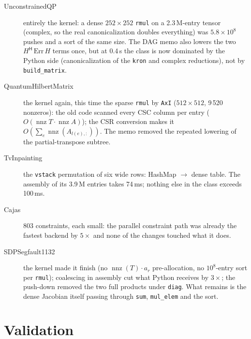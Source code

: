 \documentclass[11pt,a4paper]{article}
\newcommand{\nnz}{\operatorname{nnz}}
\newcommand{\code}[1]{\texttt{#1}}
\begin{document}
\begin{description}
  \item[UnconstrainedQP] entirely the kernel: a dense $252\times252$ \code{rmul} on a 2.3\,M-entry
  tensor (complex, so the real canonicalization doubles everything) was $5.8\times10^8$ pushes and a
  sort of the same size. The DAG memo also lowers the two $H^{\mathsf H}\,\mathrm{Err}\,H$ terms
  once, but at 0.4\,s the class is now dominated by the Python side (canonicalization of the
  \code{kron} and complex reductions), not by \code{build\_matrix}.
  \item[QuantumHilbertMatrix] the kernel again, this time the sparse \code{rmul} by \code{AxI}
  ($512\times512$, 9\,520 nonzeros): the old code scanned every CSC column per entry
  ($O(\nnz T \cdot \nnz A)$); the CSR conversion makes it $O(\sum_e \nnz(A_{l(e),:}))$. The memo
  removed the repeated lowering of the partial-transpose subtree.
  \item[TvInpainting] the \code{vstack} permutation of six wide rows: HashMap $\to$ dense table.
  The assembly of its 3.9\,M entries takes 74\,ms; nothing else in the class exceeds 100\,ms.
  \item[Cajas] 803 constraints, each small: the parallel constraint path was already the fastest
  backend by $5\times$ and none of the changes touched what it does.
  \item[SDPSegfault1132] the kernel made it finish (no $\nnz(T)\cdot a_r$ pre-allocation, no
  $10^8$-entry sort per \code{rmul}); coalescing in assembly cut what Python receives by $3\times$;
  the push-down removed the two full products under \code{diag}. What remains is the dense Jacobian
  itself passing through \code{sum}, \code{mul\_elem} and the sort.
\end{description}

\section{Validation}
\end{document}
